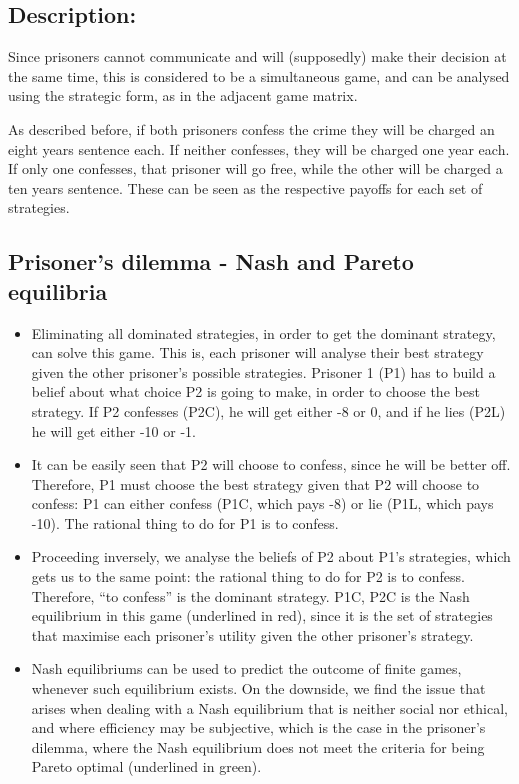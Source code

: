 \documentclass[]{report}
\begin{document}
\subsection{Description:}

Since prisoners cannot communicate and will (supposedly) make their decision at the same time, this is considered to be a simultaneous game, and can be analysed using the strategic form, as in the adjacent game matrix. 

As described before, if both prisoners confess the crime they will be charged an eight years sentence each. If neither confesses, they will be charged one year each. If only one confesses, that prisoner will go free, while the other will be charged a ten years sentence. These can be seen as the respective payoffs for each set of strategies.

\subsection{Prisoner's dilemma - Nash and Pareto equilibria}
\begin{itemize}
\item Eliminating all dominated strategies, in order to get the dominant strategy, can solve this game. This is, each prisoner will analyse their best strategy given the other prisoner’s possible strategies. Prisoner 1 (P1) has to build a belief about what choice P2 is going to make, in order to choose the best strategy. If P2 confesses (P2C), he will get either -8 or 0, and if he lies (P2L) he will get either -10 or -1. 
	
\item It can be easily seen that P2 will choose to confess, since he will be better off. Therefore, P1 must choose the best strategy given that P2 will choose to confess: P1 can either confess (P1C, which pays -8) or lie (P1L, which pays -10). The rational thing to do for P1 is to confess. 
	
\item	Proceeding inversely, we analyse the beliefs of P2 about P1’s strategies, which gets us to the same point: the rational thing to do for P2 is to confess. Therefore, “to confess” is the dominant strategy. P1C, P2C is the Nash equilibrium in this game (underlined in red), since it is the set of strategies that maximise each prisoner’s utility given the other prisoner’s strategy.
	
\item Nash equilibriums can be used to predict the outcome of finite games, whenever such equilibrium exists. On the downside, we find the issue that arises when dealing with a Nash equilibrium that is neither social nor ethical, and where efficiency may be subjective, which is the case in the prisoner’s dilemma, where the Nash equilibrium does not meet the criteria for being Pareto optimal (underlined in green).
	
\end{itemize}
\end{document}
